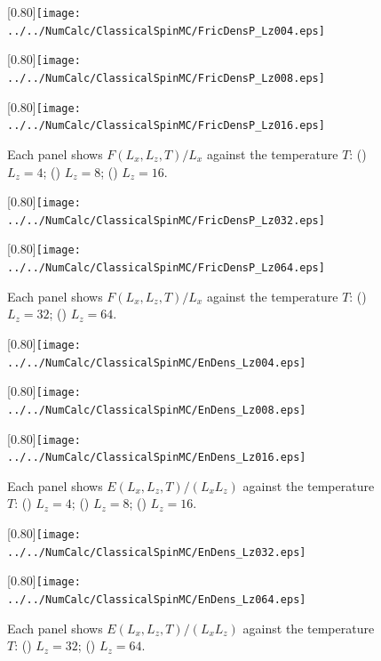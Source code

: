 \begin{figure}[htbp]
	\centering
	\subcaptionbox{\label{fig:ffdcheckfor004}}[0.80\linewidth]{\texttt{[image: ../../NumCalc/ClassicalSpinMC/FricDensP\_Lz004.eps]}}
	
	\subcaptionbox{\label{fig:ffdcheckfor008}}[0.80\linewidth]{\texttt{[image: ../../NumCalc/ClassicalSpinMC/FricDensP\_Lz008.eps]}}
	
	\subcaptionbox{\label{fig:ffdcheckfor016}}[0.80\linewidth]{\texttt{[image: ../../NumCalc/ClassicalSpinMC/FricDensP\_Lz016.eps]}}
	
	\caption{Each panel shows $F(L_{x}, L_{z}, T)/L_{x}$ against the temperature $T$: () $L_{z}=4$; () $L_{z}=8$; () $L_{z}=16$.}
	\label{fig:ffdcheck1}
\end{figure}

\begin{figure}[htbp]
	\centering
	\subcaptionbox{\label{fig:ffdcheckfor032}}[0.80\linewidth]{\texttt{[image: ../../NumCalc/ClassicalSpinMC/FricDensP\_Lz032.eps]}}
	
	\subcaptionbox{\label{fig:ffdcheckfor064}}[0.80\linewidth]{\texttt{[image: ../../NumCalc/ClassicalSpinMC/FricDensP\_Lz064.eps]}}
	
	\caption{Each panel shows $F(L_{x}, L_{z}, T)/L_{x}$ against the temperature $T$: () $L_{z}=32$; () $L_{z}=64$.}
	\label{fig:ffdcheck2}
\end{figure}

\begin{figure}[htbp]
	\centering
	\subcaptionbox{\label{fig:ebcheckfor004}}[0.80\linewidth]{\texttt{[image: ../../NumCalc/ClassicalSpinMC/EnDens\_Lz004.eps]}}
	
	\subcaptionbox{\label{fig:ebcheckfor008}}[0.80\linewidth]{\texttt{[image: ../../NumCalc/ClassicalSpinMC/EnDens\_Lz008.eps]}}
	
	\subcaptionbox{\label{fig:ebcheckfor016}}[0.80\linewidth]{\texttt{[image: ../../NumCalc/ClassicalSpinMC/EnDens\_Lz016.eps]}}
	
	\caption{Each panel shows $E(L_{x}, L_{z}, T)/(L_{x}L_{z})$ against the temperature $T$: () $L_{z}=4$; () $L_{z}=8$; () $L_{z}=16$.}
	\label{fig:ebcheck1}
\end{figure}

\begin{figure}[htbp]
	\centering
	\subcaptionbox{\label{fig:ebcheckfor032}}[0.80\linewidth]{\texttt{[image: ../../NumCalc/ClassicalSpinMC/EnDens\_Lz032.eps]}}
	
	\subcaptionbox{\label{fig:ebcheckfor064}}[0.80\linewidth]{\texttt{[image: ../../NumCalc/ClassicalSpinMC/EnDens\_Lz064.eps]}}
	
	\caption{Each panel shows $E(L_{x}, L_{z}, T)/(L_{x}L_{z})$ against the temperature $T$: () $L_{z}=32$; () $L_{z}=64$.}
	\label{fig:ebcheck2}
\end{figure}

